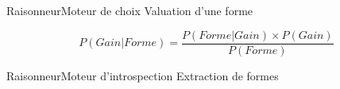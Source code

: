 \begin{frame}{Raisonneur}{Moteur de choix}
Valuation d'une forme

\[ P(Gain|Forme) = \frac{P(Forme|Gain) \times P(Gain)}{P(Forme)} \]
\end{frame}

\begin{frame}{Raisonneur}{Moteur d'introspection}
Extraction de formes
\end{frame}

